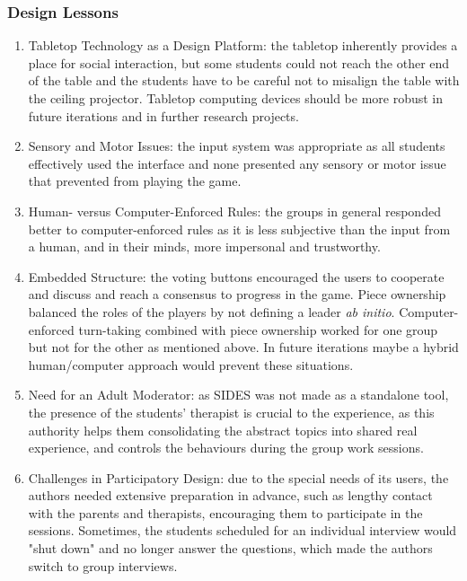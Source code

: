 \documentclass[runningheads]{llncs}
\begin{document}
\subsubsection{Design Lessons}
\begin{enumerate}
\item \par Tabletop Technology as a Design Platform: the tabletop inherently provides a place for social interaction, but some students could not reach the other end of the table and the students have to be careful not to misalign the table with the ceiling projector. Tabletop computing devices should be more robust in future iterations and in further research projects.

\item Sensory and Motor Issues: the input system was appropriate as all students effectively used the interface and none presented any sensory or motor issue that prevented from playing the game.

\item Human- versus Computer-Enforced Rules: the groups in general responded better to computer-enforced rules as it is less subjective than the input from a human, and in their minds, more impersonal and trustworthy.

\item Embedded Structure: the voting buttons encouraged the users to cooperate and discuss and reach a consensus to progress in the game. Piece ownership balanced the roles of the players by not defining a leader \textit{ab initio}. Computer-enforced turn-taking combined with piece ownership worked for one group but not for the other as mentioned above. In future iterations maybe a hybrid human/computer approach would prevent these situations.

\item Need for an Adult Moderator: as SIDES was not made as a standalone tool, the presence of the students' therapist is crucial to the experience, as this authority helps them consolidating the abstract topics into shared real experience, and controls the behaviours during the group work sessions.

\item Challenges in Participatory Design: due to the special needs of its users, the authors needed extensive preparation in advance, such as lengthy contact with the parents and therapists, encouraging them to participate in the sessions. Sometimes, the students scheduled for an individual interview would "shut down" and no longer answer the questions, which made the authors switch to group interviews.
\end{enumerate}
\end{document}
